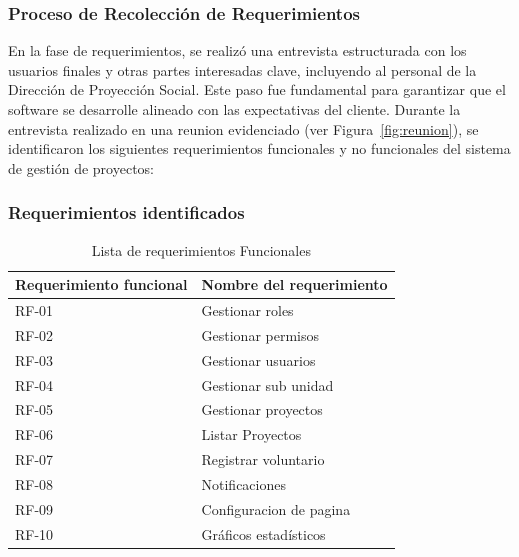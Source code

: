 \documentclass[12pt,a4paper]{article}
\begin{document}
\FloatBarrier

\subsubsection{Proceso de Recolección de Requerimientos}
En la fase de requerimientos, se realizó una entrevista estructurada con los usuarios finales y otras partes interesadas clave, incluyendo al personal de la Dirección de Proyección Social. Este paso fue fundamental para garantizar que el software se desarrolle alineado con las 
expectativas del cliente. 
Durante la entrevista realizado en una reunion evidenciado (ver Figura~\ref{fig:reunion}), se identificaron los siguientes requerimientos funcionales y no funcionales del sistema de gestión de proyectos:


\subsubsection{Requerimientos identificados}
\begin{table}[!htb]
    \centering  
    \caption{Lista de requerimientos Funcionales}
    \begin{tabular}{p{6cm} p{6cm} }
        \toprule
        \textbf{Requerimiento funcional}  &   \textbf{Nombre del requerimiento}   \\
        \midrule
        RF-01   &   Gestionar roles \\
        RF-02   &   Gestionar permisos  \\
        RF-03   &   Gestionar usuarios  \\
        RF-04   &   Gestionar sub unidad    \\
        RF-05   &   Gestionar proyectos \\
        RF-06   &   Listar Proyectos    \\
        RF-07   &   Registrar voluntario    \\
        RF-08   &   Notificaciones  \\
        RF-09   &   Configuracion de pagina \\
        RF-10   &   Gráficos estadísticos   \\
        \bottomrule
    \end{tabular}
\end{table}
\end{document}
